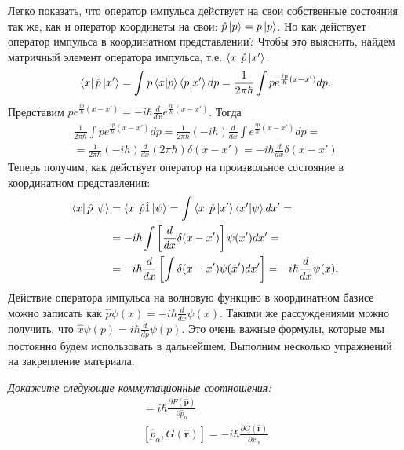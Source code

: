 Легко показать, что оператор импульса действует на свои собственные состояния так же, как и оператор координаты на свои: $\hat{p} \ket{p}=p \ket{p}$. Но как действует оператор импульса в координатном представлении? Чтобы это выяснить, найдём матричный элемент оператора импульса, т.е. $\bra{x} \hat{p} \ket{x'}$:
\[
\bra{x} \hat{p} \ket{x'} = \int p \bra{x} \ket{p} \bra{p} \ket{x'} dp = \frac{1}{2 \pi \hbar} \int p e^{\frac{i p}{\hbar}(x - x')} dp.
\]
Представим $p e^{\frac{i p}{\hbar}(x - x')} = -i \hbar \frac{d}{dx} e^{\frac{i p}{\hbar}(x - x')}$. Тогда
\begin{gather*}
    \frac{1}{2 \pi \hbar} \int p e^{\frac{i p}{\hbar}(x - x')} dp = \frac{1}{2 \pi \hbar}(-i h) \frac{d}{dx} \int e^{\frac{i p}{\hbar}(x - x')} dp = \\
    = \frac{1}{2 \pi \hbar}(-i h)\frac{d}{dx}(2 \pi \hbar)\delta(x - x') = -i \hbar \frac{d}{dx} \delta(x - x')
\end{gather*}
Теперь получим, как действует оператор на произвольное состояние в координатном представлении:
\begin{align*}
    \bra{x} \hat{p} \ket{\psi} &= \bra{x} \hat{p} \hat{1} \ket{\psi} = \int \bra{x} \hat{p} \ket{x'} \bra{x'} \ket{\psi} dx' = \\
    &= -i \hbar \int \left[\frac{d}{dx} \delta(x - x')\right] \psi(x') dx' = \\
    &= -i \hbar \frac{d}{dx} \left[\int \delta(x - x') \psi(x') dx'\right] = -i \hbar \frac{d}{dx} \psi(x).
\end{align*}
Действие оператора импульса на волновую функцию в координатном базисе можно записать как $\hat{p} \psi(x) = -i \hbar \frac{d}{dx} \psi(x)$. Такими же рассуждениями можно получить, что $\hat{x} \psi(p) = i \hbar \frac{d}{dp} \psi(p)$. Это очень важные формулы, которые мы постоянно будем использовать в дальнейшем. Выполним несколько упражнений на закрепление материала.
\begin{center}
\textit{Докажите следующие коммутационные соотношения:}
\begin{gather*}
    [\hat x_{\alpha}, F(\hat{\mathbf p})] = i \hbar \frac{\partial F(\hat{\mathbf p})}{\partial \hat p_{\alpha}} \\
    [\hat p_{\alpha}, G(\hat{\mathbf r})] = -i \hbar \frac{\partial G(\hat{\mathbf r})}{\partial \hat x_{\alpha}}
\end{gather*}
\end{center}

